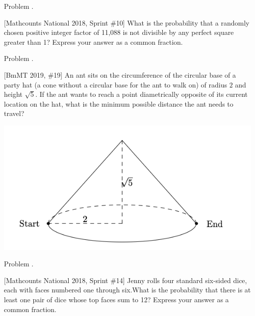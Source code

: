 \documentclass[9pt]{beamer}
\newcounter{problem}[section]
\begin{document}
\begin{frame}[t, fragile]{Problem \thesection.\theproblem}
    \begin{block}{}[Mathcounts National 2018, Sprint \#10]
    What is the probability that a randomly chosen positive integer factor of 11,088 is not divisible by any perfect square greater than 1? Express your answer as a common fraction.
    
    \end{block}
\end{frame}


\begin{frame}[t, fragile]{Problem \thesection.\theproblem}
    \begin{block}{}[BmMT 2019, \#19]
An ant sits on the circumference of the circular base of a party hat (a cone without a circular
base for the ant to walk on) of radius $2$ and height $\sqrt{5}$. If the ant wants to reach a point
diametrically opposite of its current location on the hat, what is the minimum possible distance
the ant needs to travel?


    \end{block}
    \begin{center}
        \includegraphics[scale=0.5]{bmmt2019_19_p}
    \end{center}
\end{frame}



\begin{frame}[t, fragile]{Problem \thesection.\theproblem}
    \begin{block}{}[Mathcounts National 2018, Sprint \#14]
    Jenny rolls four standard six-sided dice, each with faces numbered one through six.What is the probability that there is at least one pair of dice whose top faces sum to 12? Express your answer as a common fraction.
    
    \end{block}
\end{frame}
\end{document}

